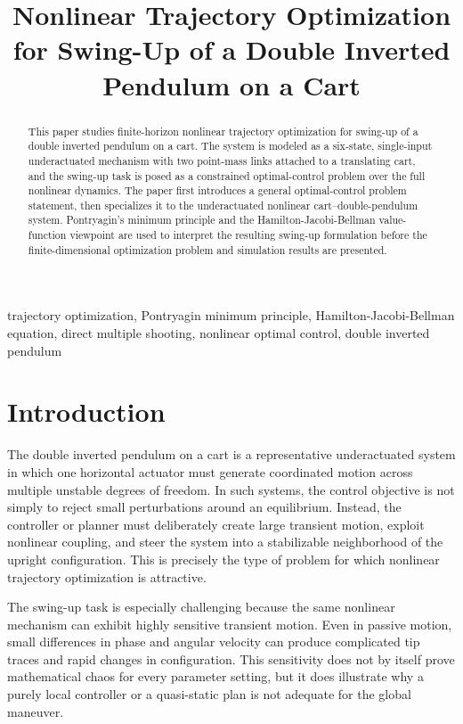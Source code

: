 \documentclass[conference]{IEEEtran}
\title{Nonlinear Trajectory Optimization for Swing-Up of a Double Inverted Pendulum on a Cart}
\author{
\IEEEauthorblockN{JunYoung Kim}
\IEEEauthorblockA{Department of Mechanical and Aerospace Engineering\\
MAE589: Advanced Robotics Course Project Report}
}
\begin{document}
\maketitle

\begin{abstract}
This paper studies finite-horizon nonlinear trajectory optimization for swing-up of a double inverted pendulum on a cart. The system is modeled as a six-state, single-input underactuated mechanism with two point-mass links attached to a translating cart, and the swing-up task is posed as a constrained optimal-control problem over the full nonlinear dynamics. The paper first introduces a general optimal-control problem statement, then specializes it to the underactuated nonlinear cart--double-pendulum system. Pontryagin's minimum principle and the Hamilton-Jacobi-Bellman value-function viewpoint are used to interpret the resulting swing-up formulation before the finite-dimensional optimization problem and simulation results are presented.
\end{abstract}

\begin{IEEEkeywords}
trajectory optimization, Pontryagin minimum principle, Hamilton-Jacobi-Bellman equation, direct multiple shooting, nonlinear optimal control, double inverted pendulum
\end{IEEEkeywords}

\section{Introduction}
The double inverted pendulum on a cart is a representative underactuated system in which one horizontal actuator must generate coordinated motion across multiple unstable degrees of freedom. In such systems, the control objective is not simply to reject small perturbations around an equilibrium. Instead, the controller or planner must deliberately create large transient motion, exploit nonlinear coupling, and steer the system into a stabilizable neighborhood of the upright configuration. This is precisely the type of problem for which nonlinear trajectory optimization is attractive.

The swing-up task is especially challenging because the same nonlinear mechanism can exhibit highly sensitive transient motion. Even in passive motion, small differences in phase and angular velocity can produce complicated tip traces and rapid changes in configuration. This sensitivity does not by itself prove mathematical chaos for every parameter setting, but it does illustrate why a purely local controller or a quasi-static plan is not adequate for the global maneuver.
\end{document}
